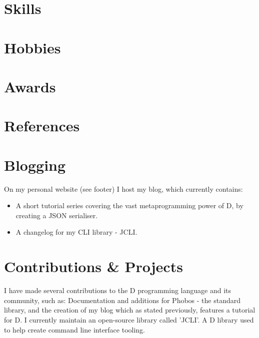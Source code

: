 \documentclass[11pt,a4paper,sans]{moderncv}
\newcommand{\usestylemodern}{Modern}
\let\usestylemodern\undefined
\begin{document}
\section{Skills}

\section{Hobbies}

\section{Awards}

\section{References}

\ifdefined\usestylemodern
\newpage

\section{Blogging}
\cvitem{}
{
    On my personal website (see footer) I host my blog, which currently contains:
    \begin{itemize}
        \item A short tutorial series covering the vast metaprogramming power of D, by creating a JSON serialiser.
        \item A changelog for my CLI library - JCLI.
    \end{itemize}
}

\section{Contributions \& Projects}
{
    I have made several contributions to the D programming language and its community, such as:
    Documentation and additions for Phobos - the standard library, and the creation of my blog
    which as stated previously, features a tutorial for D.
}
{
    I currently maintain an open-source library called 'JCLI'. A D library used to help create
    command line interface tooling.
}

\fi
\end{document}
